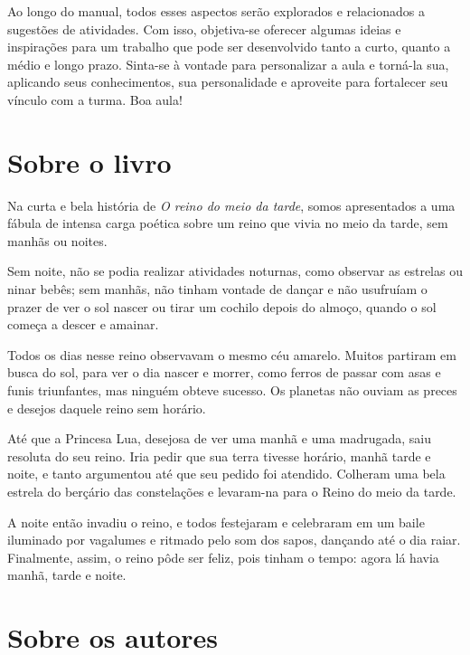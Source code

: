\documentclass[11pt]{extarticle}
\begin{document}
Ao longo do manual, todos esses aspectos serão explorados e relacionados a sugestões de atividades. Com isso, objetiva-se oferecer algumas ideias e inspirações para um trabalho que pode ser desenvolvido tanto a curto, quanto a médio e longo prazo. Sinta-se à vontade para personalizar a aula e torná-la sua, aplicando seus conhecimentos, sua 
personalidade e aproveite para fortalecer seu vínculo com a turma.
Boa aula!

\section{Sobre o livro}
Na curta e bela história de \textit{O reino do meio da tarde}, somos apresentados a uma fábula de intensa carga poética sobre um reino que vivia no meio da tarde, sem manhãs ou noites.

Sem noite, não se podia realizar atividades noturnas, como observar as estrelas ou ninar bebês; sem manhãs, não tinham vontade de dançar e não usufruíam o prazer de ver o sol nascer ou tirar um cochilo depois do almoço, quando o sol começa a descer e amainar.

Todos os dias nesse reino observavam o mesmo céu amarelo. Muitos partiram em busca do sol, para ver o dia nascer e morrer, como ferros de passar com asas e funis triunfantes, mas ninguém obteve sucesso. Os planetas não ouviam as preces e desejos daquele reino sem horário.

Até que a Princesa Lua, desejosa de ver uma manhã e uma madrugada, saiu resoluta do seu reino. Iria pedir que sua terra tivesse horário, manhã tarde e noite, e tanto argumentou até que seu pedido foi atendido. Colheram uma bela estrela do berçário das constelações e levaram-na para o Reino do meio da tarde.

A noite então invadiu o reino, e todos festejaram e celebraram em um baile iluminado por vagalumes e ritmado pelo som dos sapos, dançando até o dia raiar. Finalmente, assim, o reino pôde ser feliz, pois tinham o tempo: agora lá havia manhã, tarde e noite.

\reversemarginpar
\marginparwidth=5cm



\section{Sobre os autores}
\end{document}
